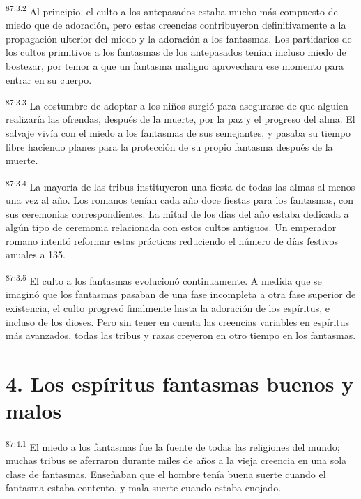 \documentclass[twoside, 11pt]{book}
\begin{document}
\par
\textsuperscript{87:3.2} Al principio, el culto a los antepasados estaba mucho más compuesto de miedo que de adoración, pero estas creencias contribuyeron definitivamente a la propagación ulterior del miedo y la adoración a los fantasmas. Los partidarios de los cultos primitivos a los fantasmas de los antepasados tenían incluso miedo de bostezar, por temor a que un fantasma maligno aprovechara ese momento para entrar en su cuerpo.

\par
\textsuperscript{87:3.3} La costumbre de adoptar a los niños surgió para asegurarse de que alguien realizaría las ofrendas, después de la muerte, por la paz y el progreso del alma. El salvaje vivía con el miedo a los fantasmas de sus semejantes, y pasaba su tiempo libre haciendo planes para la protección de su propio fantasma después de la muerte.

\par
\textsuperscript{87:3.4} La mayoría de las tribus instituyeron una fiesta de todas las almas al menos una vez al año. Los romanos tenían cada año doce fiestas para los fantasmas, con sus ceremonias correspondientes. La mitad de los días del año estaba dedicada a algún tipo de ceremonia relacionada con estos cultos antiguos. Un emperador romano intentó reformar estas prácticas reduciendo el número de días festivos anuales a 135.

\par
\textsuperscript{87:3.5} El culto a los fantasmas evolucionó continuamente. A medida que se imaginó que los fantasmas pasaban de una fase incompleta a otra fase superior de existencia, el culto progresó finalmente hasta la adoración de los espíritus, e incluso de los dioses. Pero sin tener en cuenta las creencias variables en espíritus más avanzados, todas las tribus y razas creyeron en otro tiempo en los fantasmas.

\section*{4. Los espíritus fantasmas buenos y malos}
\par
\textsuperscript{87:4.1} El miedo a los fantasmas fue la fuente de todas las religiones del mundo; muchas tribus se aferraron durante miles de años a la vieja creencia en una sola clase de fantasmas. Enseñaban que el hombre tenía buena suerte cuando el fantasma estaba contento, y mala suerte cuando estaba enojado.
\end{document}
